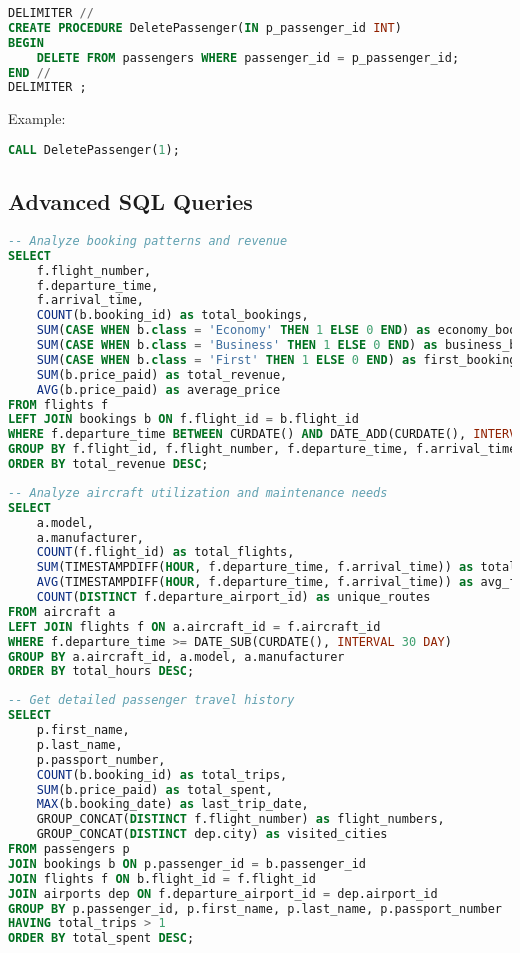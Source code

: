 \documentclass[a4paper,12pt]{article}
\begin{document}
\begin{lstlisting}[language=SQL, caption=DeletePassenger Stored Procedure]
DELIMITER //
CREATE PROCEDURE DeletePassenger(IN p_passenger_id INT)
BEGIN
    DELETE FROM passengers WHERE passenger_id = p_passenger_id;
END //
DELIMITER ;
\end{lstlisting}
Example:
\begin{lstlisting}[language=SQL]
CALL DeletePassenger(1);
\end{lstlisting}

\subsection{Advanced SQL Queries}
\begin{lstlisting}[language=SQL, caption=Complex Booking Analysis Query]
-- Analyze booking patterns and revenue
SELECT 
    f.flight_number,
    f.departure_time,
    f.arrival_time,
    COUNT(b.booking_id) as total_bookings,
    SUM(CASE WHEN b.class = 'Economy' THEN 1 ELSE 0 END) as economy_bookings,
    SUM(CASE WHEN b.class = 'Business' THEN 1 ELSE 0 END) as business_bookings,
    SUM(CASE WHEN b.class = 'First' THEN 1 ELSE 0 END) as first_bookings,
    SUM(b.price_paid) as total_revenue,
    AVG(b.price_paid) as average_price
FROM flights f
LEFT JOIN bookings b ON f.flight_id = b.flight_id
WHERE f.departure_time BETWEEN CURDATE() AND DATE_ADD(CURDATE(), INTERVAL 30 DAY)
GROUP BY f.flight_id, f.flight_number, f.departure_time, f.arrival_time
ORDER BY total_revenue DESC;
\end{lstlisting}

\begin{lstlisting}[language=SQL, caption=Aircraft Utilization Analysis]
-- Analyze aircraft utilization and maintenance needs
SELECT 
    a.model,
    a.manufacturer,
    COUNT(f.flight_id) as total_flights,
    SUM(TIMESTAMPDIFF(HOUR, f.departure_time, f.arrival_time)) as total_hours,
    AVG(TIMESTAMPDIFF(HOUR, f.departure_time, f.arrival_time)) as avg_flight_duration,
    COUNT(DISTINCT f.departure_airport_id) as unique_routes
FROM aircraft a
LEFT JOIN flights f ON a.aircraft_id = f.aircraft_id
WHERE f.departure_time >= DATE_SUB(CURDATE(), INTERVAL 30 DAY)
GROUP BY a.aircraft_id, a.model, a.manufacturer
ORDER BY total_hours DESC;
\end{lstlisting}

\begin{lstlisting}[language=SQL, caption=Passenger Travel History]
-- Get detailed passenger travel history
SELECT 
    p.first_name,
    p.last_name,
    p.passport_number,
    COUNT(b.booking_id) as total_trips,
    SUM(b.price_paid) as total_spent,
    MAX(b.booking_date) as last_trip_date,
    GROUP_CONCAT(DISTINCT f.flight_number) as flight_numbers,
    GROUP_CONCAT(DISTINCT dep.city) as visited_cities
FROM passengers p
JOIN bookings b ON p.passenger_id = b.passenger_id
JOIN flights f ON b.flight_id = f.flight_id
JOIN airports dep ON f.departure_airport_id = dep.airport_id
GROUP BY p.passenger_id, p.first_name, p.last_name, p.passport_number
HAVING total_trips > 1
ORDER BY total_spent DESC;
\end{lstlisting}
\end{document}
